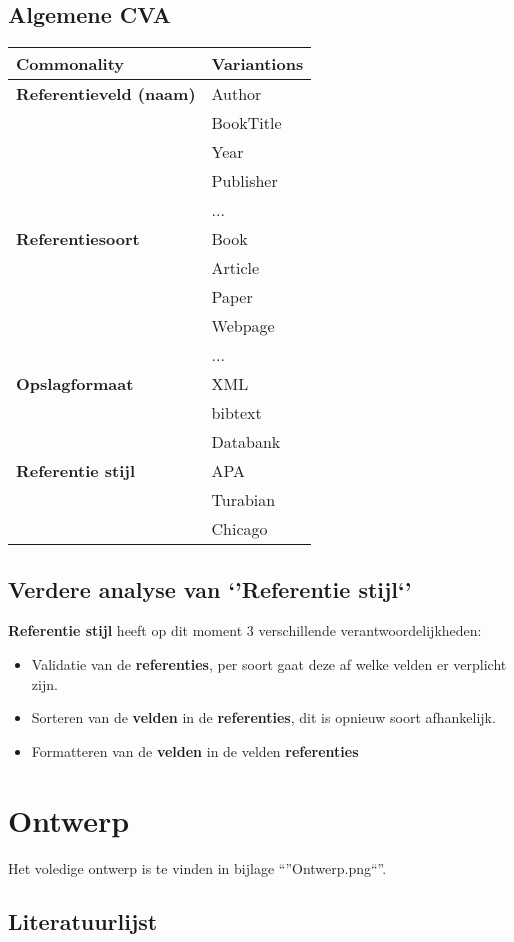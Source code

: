 \documentclass[a4paper]{article}
\begin{document}
\subsection{Algemene CVA}
\begin{tabularx}{\textwidth}{ | l | X |}
	\hline
	\textbf{Commonality} & \textbf{Variantions}\\ \hline
	\textbf{Referentieveld (naam)} & Author\\
	  & BookTitle\\ 
	  & Year\\ 
	  & Publisher\\ 
	  & ...\\ \hline
	\textbf{Referentiesoort} & Book\\
	  & Article\\ 
	  & Paper\\ 
	  & Webpage\\ 
	  & ...\\ \hline
	\textbf{Opslagformaat} & XML\\
	  & bibtext\\ 
	  & Databank\\ \hline
	\textbf{Referentie stijl} & APA\\
	  & Turabian\\ 
	  & Chicago\\ \hline
\end{tabularx}

\subsection{Verdere analyse van `'Referentie stijl`'}
\textbf{Referentie stijl} heeft op dit moment 3 verschillende verantwoordelijkheden:
\begin{itemize}
	\item Validatie van de \textbf{referenties}, per soort gaat deze af welke velden er verplicht zijn.
	\item Sorteren van de \textbf{velden} in de \textbf{referenties}, dit is opnieuw soort afhankelijk.
	\item Formatteren van de \textbf{velden} in de velden \textbf{referenties}
\end{itemize}

\section{Ontwerp}
Het voledige ontwerp is te vinden in bijlage ``''Ontwerp.png``''.
\subsection{Literatuurlijst}
\end{document}

